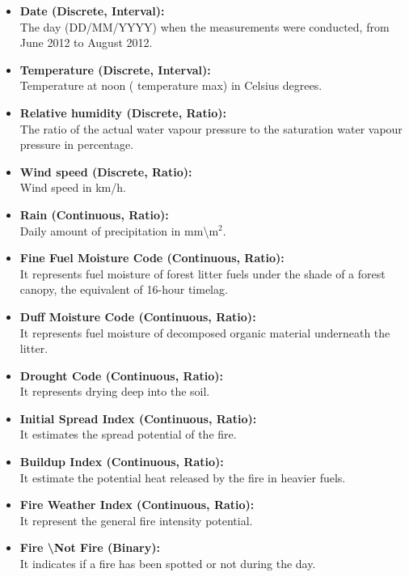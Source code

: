 \documentclass[10pt]{article}
\numberwithin{equation}{section}
\numberwithin{figure}{section}
\numberwithin{table}{section}
\begin{document}
\begin{itemize}
    \item \textbf{Date (Discrete, Interval):\\} The day (DD/MM/YYYY) when the measurements were conducted, from June 2012 to August 2012. 
    
    \item \textbf{Temperature (Discrete, Interval):\\} Temperature at noon ( temperature max) in Celsius degrees.
    
    \item \textbf{Relative humidity (Discrete, Ratio):\\} The ratio of the actual water vapour pressure to the saturation water vapour pressure in percentage.
    
    \item \textbf{Wind speed (Discrete, Ratio):\\} Wind speed in km/h.
    \item \textbf{Rain (Continuous, Ratio):\\} Daily amount of precipitation in mm\textbackslash m$^2$.
    
    \item \textbf{Fine Fuel Moisture Code (Continuous, Ratio):\\} It represents fuel moisture of forest litter fuels under the shade of a forest canopy, the equivalent of 16-hour timelag.
    
    \item \textbf{Duff Moisture Code (Continuous, Ratio):\\}
    It represents fuel moisture of decomposed organic material underneath the litter.
    \item \textbf{Drought Code (Continuous, Ratio):\\}
    It represents drying deep into the soil.
    
    \item \textbf{Initial Spread Index (Continuous, Ratio):\\}
    It estimates the spread potential of the fire.
    
    \item \textbf{Buildup Index (Continuous, Ratio):\\}
    It estimate the potential heat released by the fire in heavier fuels.
    
    \item \textbf{Fire Weather Index (Continuous, Ratio):\\}
    It represent the general fire intensity potential.
    
    \item \textbf{Fire \textbackslash Not Fire (Binary):\\}
    It indicates if a fire has been spotted or not during the day.
    
\end{itemize}
\end{document}
